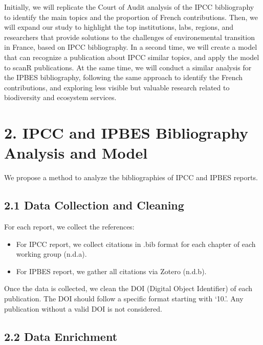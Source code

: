 \documentclass[
]{article}
\providecommand{\tightlist}{%
  \setlength{\itemsep}{0pt}\setlength{\parskip}{0pt}}
\begin{document}
Initially, we will replicate the Court of Audit analysis of the IPCC
bibliography to identify the main topics and the proportion of French
contributions. Then, we will expand our study to highlight the top
institutions, labs, regions, and researchers that provide solutions to
the challenges of environemental transition in France, based on IPCC
bibliography. In a second time, we will create a model that can
recognize a publication about IPCC similar topics, and apply the model
to scanR publications. At the same time, we will conduct a similar
analysis for the IPBES bibliography, following the same approach to
identify the French contributions, and exploring less visible but
valuable research related to biodiversity and ecosystem services.

\hypertarget{ipcc-and-ipbes-bibliography-analysis-and-model}{%
\section{2. IPCC and IPBES Bibliography Analysis and
Model}\label{ipcc-and-ipbes-bibliography-analysis-and-model}}

We propose a method to analyze the bibliographies of IPCC and IPBES
reports.

\hypertarget{data-collection-and-cleaning}{%
\subsection{2.1 Data Collection and
Cleaning}\label{data-collection-and-cleaning}}

For each report, we collect the references:

\begin{itemize}
\tightlist
\item
  For IPCC report, we collect citations in .bib format for each chapter
  of each working group (n.d.a).
\item
  For IPBES report, we gather all citations via Zotero (n.d.b).
\end{itemize}

Once the data is collected, we clean the DOI (Digital Object Identifier)
of each publication. The DOI should follow a specific format starting
with `10.'. Any publication without a valid DOI is not considered.

\hypertarget{data-enrichment}{%
\subsection{2.2 Data Enrichment}\label{data-enrichment}}
\end{document}
